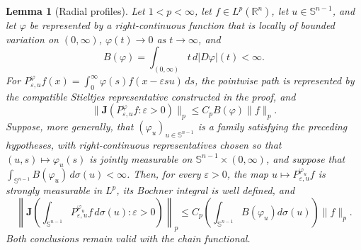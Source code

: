 \documentclass[11pt]{article}
\numberwithin{equation}{section}
\newtheorem{lemma}[theorem]{Lemma}
\theoremstyle{remark}
\theoremstyle{definition}
\newcommand{\R}{\mathbb R}
\newcommand{\Sph}{\mathbb S}
\newcommand{\norm}[1]{\lVert #1\rVert}
\begin{document}
\begin{lemma}[Radial profiles]\label{lem:profiles}
Let $1<p<\infty$, let $f\in L^p(\R^n)$, let
$u\in\Sph^{n-1}$, and let $\varphi$ be represented
by a right-continuous function that is locally of bounded variation on
$(0,\infty)$,
$\varphi(t)\to0$ as $t\to\infty$, and
\[
 B(\varphi)=\int_{(0,\infty)}t\,d|D\varphi|(t)<\infty.
\]
For $P^{\varphi}_{\varepsilon,u}f(x)=
\int_0^\infty\varphi(s)f(x-\varepsilon su)\,ds$,
the pointwise path is represented by the compatible Stieltjes
representative constructed in the proof, and
\begin{equation}\label{eq:profile-jump}
 \norm{\mathbf J(P^{\varphi}_{\varepsilon,u}f:\varepsilon>0)}_p
 \le C_pB(\varphi)\norm f_p.
\end{equation}
Suppose, more generally, that $(\varphi_u)_{u\in\Sph^{n-1}}$ is a family
satisfying the preceding hypotheses, with right-continuous representatives
chosen so that $(u,s)\mapsto\varphi_u(s)$ is jointly measurable on
$\Sph^{n-1}\times(0,\infty)$, and suppose that
$\int_{\Sph^{n-1}}B(\varphi_u)\,d\sigma(u)<\infty$.  Then, for every
$\varepsilon>0$, the map $u\mapsto P^{\varphi_u}_{\varepsilon,u}f$ is
strongly measurable in $L^p$, its Bochner integral is well defined, and
\begin{equation}\label{eq:profile-integrated-jump}
 \left\|\mathbf J\left(
  \int_{\Sph^{n-1}}P^{\varphi_u}_{\varepsilon,u}f\,d\sigma(u):
  \varepsilon>0\right)\right\|_p
 \le C_p\left(\int_{\Sph^{n-1}}B(\varphi_u)d\sigma(u)\right)\norm f_p.
\end{equation}
Both conclusions remain valid with the chain functional.
\end{lemma}
\end{document}

